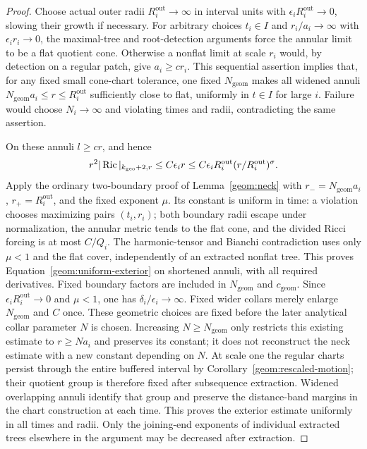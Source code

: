 \begin{proof}
Choose actual outer radii $R_i^{\mathrm{out}}\to\infty$ in interval
units with $\epsilon_iR_i^{\mathrm{out}}\to0$, slowing their growth
if necessary. For arbitrary choices $t_i\in I$ and
$r_i/a_i\to\infty$ with $\epsilon_i r_i\to0$, the maximal-tree
and root-detection arguments force the annular limit to be a flat
quotient cone. Otherwise a nonflat limit at scale $r_i$ would, by
detection on a regular patch, give $a_i\geq c r_i$. This sequential
assertion implies that, for any fixed small cone-chart tolerance,
one fixed $N_{\mathrm{geom}}$ makes all widened annuli
$N_{\mathrm{geom}}a_i\leq r\leq R_i^{\mathrm{out}}$ sufficiently close to flat,
uniformly in $t\in I$ for large $i$. Failure would choose
$N_i\to\infty$ and violating times and radii, contradicting the
same assertion.

On these annuli $l\geq cr$, and hence
\[
 r^2|\operatorname{Ric}|_{k_{\mathrm{geo}}+2,r}\leq C\epsilon_i r
 \leq C\epsilon_iR_i^{\mathrm{out}}
             (r/R_i^{\mathrm{out}})^\sigma.
\]
Apply the ordinary two-boundary proof of Lemma~\ref{geom:neck}
with $r_-=N_{\mathrm{geom}}a_i$, $r_+=R_i^{\mathrm{out}}$, and the fixed exponent
$\mu$. Its constant is uniform in time: a violation chooses
maximizing pairs $(t_i,r_i)$; both boundary radii escape under
normalization, the annular metric tends to the flat cone, and the
divided Ricci forcing is at most $C/Q_i$. The harmonic-tensor and
Bianchi contradiction uses only $\mu<1$ and the flat cover,
independently of an extracted nonflat tree. This proves
Equation~\eqref{geom:uniform-exterior} on shortened
annuli, with all required derivatives. Fixed boundary factors are
included in $N_{\mathrm{geom}}$ and $c_{\mathrm{geom}}$.
Since $\epsilon_iR_i^{\mathrm{out}}\to0$ and $\mu<1$, one has
$\delta_i/\epsilon_i\to\infty$. Fixed wider collars merely
enlarge $N_{\mathrm{geom}}$ and $C$ once. These geometric choices
are fixed before the later analytical collar parameter $N$ is chosen.
Increasing $N\geq N_{\mathrm{geom}}$ only restricts this existing
estimate to $r\geq Na_i$ and preserves its constant; it does not
reconstruct the neck estimate with a new constant depending on $N$.
At scale one the regular charts persist
through the entire buffered interval by
Corollary~\ref{geom:rescaled-motion}; their quotient group is
therefore fixed after subsequence extraction. Widened overlapping
annuli identify that group and preserve the distance-band margins
in the chart construction at each time. This proves the exterior
estimate uniformly in all times and radii. Only the joining-end
exponents of individual extracted trees elsewhere in the argument
may be decreased after extraction.
\end{proof}
